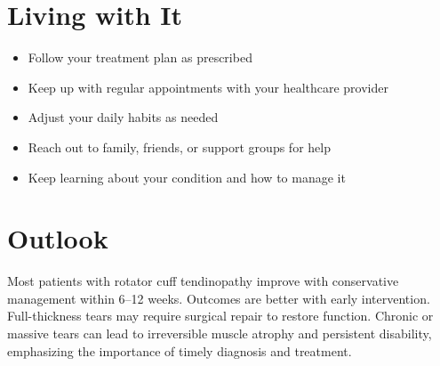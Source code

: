 \section{Living with It}

\begin{itemize}[noitemsep]
  \item Follow your treatment plan as prescribed
  \item Keep up with regular appointments with your healthcare provider
  \item Adjust your daily habits as needed
  \item Reach out to family, friends, or support groups for help
  \item Keep learning about your condition and how to manage it
\end{itemize}

\section{Outlook}
Most patients with rotator cuff tendinopathy improve with conservative management within 6--12 weeks. Outcomes are better with early intervention. Full-thickness tears may require surgical repair to restore function. Chronic or massive tears can lead to irreversible muscle atrophy and persistent disability, emphasizing the importance of timely diagnosis and treatment.
